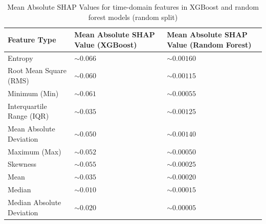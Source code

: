 \documentclass[preprint,12pt]{elsarticle}
\begin{document}
\begin{table}[!htbp]
\centering
\caption{Mean Absolute SHAP Values for time-domain features in XGBoost and random forest models (random split)}
\label{tab:feature_shap_contributions}
\begin{tabular}{L{0.3\textwidth} L{0.3\textwidth} L{0.3\textwidth}}
\toprule
\textbf{Feature Type} & \textbf{Mean Absolute SHAP Value (XGBoost)} & \textbf{Mean Absolute SHAP Value (Random Forest)} \\
\midrule
Entropy                     & \textit{$\sim 0.066$} & \textit{$\sim 0.00160$} \\
\addlinespace
Root Mean Square (RMS)      & \textit{$\sim 0.060$} & \textit{$\sim 0.00115$} \\
\addlinespace
Minimum (Min)               & \textit{$\sim 0.061$} & \textit{$\sim 0.00055$} \\
\addlinespace
Interquartile Range (IQR)   & \textit{$\sim 0.035$} & \textit{$\sim 0.00125$} \\
\addlinespace
Mean Absolute Deviation     & \textit{$\sim 0.050$} & \textit{$\sim 0.00140$} \\
\addlinespace
Maximum (Max)               & \textit{$\sim 0.052$} & \textit{$\sim 0.00050$} \\
\addlinespace
Skewness                    & \textit{$\sim 0.055$} & \textit{$\sim 0.00025$} \\
\addlinespace
Mean                        & \textit{$\sim 0.035$} & \textit{$\sim 0.00020$} \\
\addlinespace
Median                      & \textit{$\sim 0.010$} & \textit{$\sim 0.00015$} \\
\addlinespace
Median Absolute Deviation   & \textit{$\sim 0.020$} & \textit{$\sim 0.00005$} \\
\bottomrule
\end{tabular}%
\vspace{2mm}
\end{table}
\end{document}
